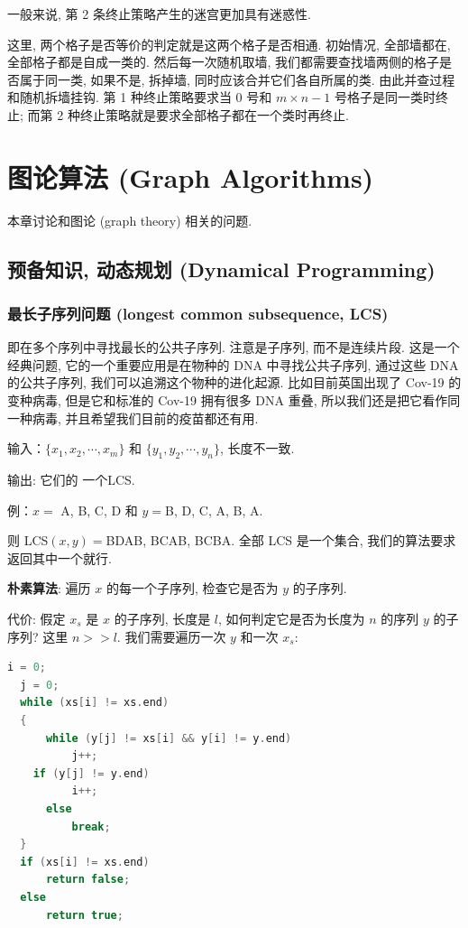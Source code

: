 \documentclass[a4paper]{ctexart}
\theoremstyle{definition}
\theoremstyle{definition}
\begin{document}
一般来说, 第 2 条终止策略产生的迷宫更加具有迷惑性. 

这里, 两个格子是否等价的判定就是这两个格子是否相通. 
初始情况, 全部墙都在, 全部格子都是自成一类的. 然后每一次随机取墙, 
我们都需要查找墙两侧的格子是否属于同一类, 如果不是, 拆掉墙, 同时应该合并它们各自所属的类. 
由此并查过程和随机拆墙挂钩. 第 1 种终止策略要求当 $0$ 号和 $m \times n - 1$ 号格子是同一类时终止;  
而第 2 种终止策略就是要求全部格子都在一个类时再终止. 


\section{图论算法 (Graph Algorithms)}

本章讨论和图论 (graph theory) 相关的问题. 

\subsection*{预备知识, 动态规划 (Dynamical Programming)}

\subsubsection{最长子序列问题 (longest common subsequence, LCS)}

即在多个序列中寻找最长的公共子序列. 注意是子序列, 而不是连续片段. 这是一个经典问题, 
它的一个重要应用是在物种的 DNA 中寻找公共子序列, 通过这些 DNA 的公共子序列, 
我们可以追溯这个物种的进化起源. 比如目前英国出现了 Cov-19 的变种病毒, 
但是它和标准的 Cov-19 拥有很多 DNA 重叠, 所以我们还是把它看作同一种病毒, 
并且希望我们目前的疫苗都还有用.

输入：$\{x_1, x_2, \cdots, x_m\}$ 和 $\{y_1, y_2, \cdots, y_n\}$, 长度不一致. 

输出: 它们的 一个LCS.

例：$x =$ A, B, C, D 和 $y =$B, D, C, A, B, A.

则 LCS$(x, y) = $BDAB, BCAB, BCBA. 全部 LCS 是一个集合, 我们的算法要求返回其中一个就行.

\textbf{朴素算法}: 遍历 $x$ 的每一个子序列, 检查它是否为 $y$ 的子序列.

代价: 假定 $x_s$ 是 $x$ 的子序列, 长度是 $l$, 如何判定它是否为长度为 $n$ 的序列 $y$ 的子序列? 
这里 $n >> l$. 我们需要遍历一次 $y$ 和一次 $x_s$:

\begin{lstlisting}[language=c++]
  i = 0;
  j = 0;
  while (xs[i] != xs.end)
  {
      while (y[j] != xs[i] && y[i] != y.end)
          j++;
    if (y[j] != y.end)
          i++;
      else
          break;
  }
  if (xs[i] != xs.end)
      return false;
  else
      return true;    
\end{lstlisting}
\end{document}
